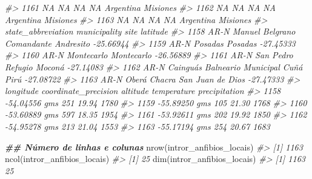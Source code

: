 \documentclass[
]{book}
\newenvironment{Shaded}{\begin{snugshade}}{\end{snugshade}}
\newcommand{\CommentTok}[1]{\textcolor[rgb]{0.37,0.37,0.37}{\textit{#1}}}
\newcommand{\DocumentationTok}[1]{\textcolor[rgb]{0.37,0.37,0.37}{\textbf{\textit{#1}}}}
\newcommand{\FunctionTok}[1]{\textcolor[rgb]{0,0,0}{#1}}
\newcommand{\NormalTok}[1]{#1}
\begin{document}
\begin{Shaded}
\begin{Highlighting}[]
\CommentTok{\#\textgreater{} 1161         NA           NA          NA            NA Argentina Misiones}
\CommentTok{\#\textgreater{} 1162         NA           NA          NA            NA Argentina Misiones}
\CommentTok{\#\textgreater{} 1163         NA           NA          NA            NA Argentina Misiones}
\CommentTok{\#\textgreater{}      state\_abbreviation    municipality                          site  latitude}
\CommentTok{\#\textgreater{} 1158               AR{-}N Manuel Belgrano          Comandante Andresito {-}25.66944}
\CommentTok{\#\textgreater{} 1159               AR{-}N         Posadas                       Posadas {-}27.45333}
\CommentTok{\#\textgreater{} 1160               AR{-}N      Montecarlo                    Montecarlo {-}26.56889}
\CommentTok{\#\textgreater{} 1161               AR{-}N       San Pedro                Refugio Moconá {-}27.14083}
\CommentTok{\#\textgreater{} 1162               AR{-}N        Cainguás Balneario Municipal Cuñá Pirú {-}27.08722}
\CommentTok{\#\textgreater{} 1163               AR{-}N           Oberá       Chacra San Juan de Dios {-}27.47333}
\CommentTok{\#\textgreater{}      longitude coordinate\_precision altitude temperature precipitation}
\CommentTok{\#\textgreater{} 1158 {-}54.04556                  gms      251       19.94          1780}
\CommentTok{\#\textgreater{} 1159 {-}55.89250                  gms      105       21.30          1768}
\CommentTok{\#\textgreater{} 1160 {-}53.60889                  gms      597       18.35          1954}
\CommentTok{\#\textgreater{} 1161 {-}53.92611                  gms      202       19.92          1850}
\CommentTok{\#\textgreater{} 1162 {-}54.95278                  gms      213       21.04          1553}
\CommentTok{\#\textgreater{} 1163 {-}55.17194                  gms      254       20.67          1683}

\DocumentationTok{\#\# Número de linhas e colunas}
\FunctionTok{nrow}\NormalTok{(intror\_anfibios\_locais)}
\CommentTok{\#\textgreater{} [1] 1163}
\FunctionTok{ncol}\NormalTok{(intror\_anfibios\_locais)}
\CommentTok{\#\textgreater{} [1] 25}
\FunctionTok{dim}\NormalTok{(intror\_anfibios\_locais)}
\CommentTok{\#\textgreater{} [1] 1163   25}
\end{Highlighting}
\end{Shaded}
\end{document}
